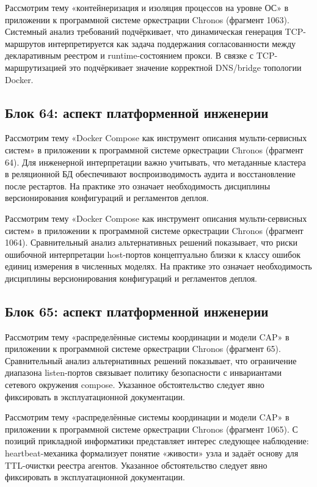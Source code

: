  Рассмотрим тему «контейнеризация и изоляция процессов на уровне ОС» в приложении к программной системе оркестрации Chronos (фрагмент 1063). Системный анализ требований подчёркивает, что динамическая генерация TCP-маршрутов интерпретируется как задача поддержания согласованности между декларативным реестром и runtime-состоянием прокси. В связке с TCP-маршрутизацией это подчёркивает значение корректной DNS/bridge топологии Docker.

\subsection{Блок 64: аспект платформенной инженерии}
 Рассмотрим тему «Docker Compose как инструмент описания мульти-сервисных систем» в приложении к программной системе оркестрации Chronos (фрагмент 64). Для инженерной интерпретации важно учитывать, что метаданные кластера в реляционной БД обеспечивают воспроизводимость аудита и восстановление после рестартов. На практике это означает необходимость дисциплины версионирования конфигураций и регламентов деплоя.

 Рассмотрим тему «Docker Compose как инструмент описания мульти-сервисных систем» в приложении к программной системе оркестрации Chronos (фрагмент 1064). Сравнительный анализ альтернативных решений показывает, что риски ошибочной интерпретации host-портов концептуально близки к классу ошибок единиц измерения в численных моделях. На практике это означает необходимость дисциплины версионирования конфигураций и регламентов деплоя.

\subsection{Блок 65: аспект платформенной инженерии}
 Рассмотрим тему «распределённые системы координации и модели CAP» в приложении к программной системе оркестрации Chronos (фрагмент 65). Сравнительный анализ альтернативных решений показывает, что ограничение диапазона listen-портов связывает политику безопасности с инвариантами сетевого окружения compose. Указанное обстоятельство следует явно фиксировать в эксплуатационной документации.

 Рассмотрим тему «распределённые системы координации и модели CAP» в приложении к программной системе оркестрации Chronos (фрагмент 1065). С позиций прикладной информатики представляет интерес следующее наблюдение: heartbeat-механика формализует понятие «живости» узла и задаёт основу для TTL-очистки реестра агентов. Указанное обстоятельство следует явно фиксировать в эксплуатационной документации.

